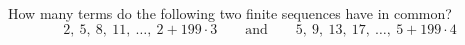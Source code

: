 How many terms do the following two finite sequences have in common?
\[2,\ 5,\ 8,\ 11,\ \dots,\ 2+199\cdot3\qquad\text{and}\qquad 5,\ 9,\ 13,\ 17,\ \dots,\ 5+199\cdot4\]
